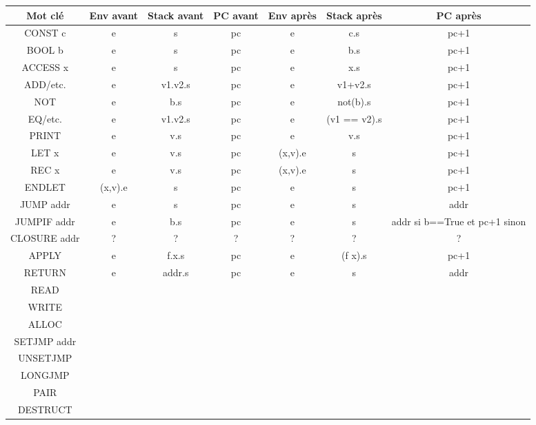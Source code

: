 \documentclass{article}
\begin{document}
\begin{footnotesize}
\begin{tabular}{ c | c | c  | c || c | c | c }

Mot clé & Env avant & Stack avant & PC avant & Env après & Stack après & PC après \\
\hline
CONST c & e & s & pc & e & c.s & pc+1 \\

BOOL b & e & s & pc & e & b.s & pc+1 \\

ACCESS x & e & s & pc & e & x.s & pc+1 \\

ADD/etc. & e & v1.v2.s & pc & e & v1+v2.s & pc+1\\

NOT & e & b.s & pc & e & not(b).s & pc+1\\

EQ/etc. & e & v1.v2.s & pc & e & (v1 == v2).s & pc+1\\

PRINT & e & v.s & pc & e & v.s & pc+1 \\

LET x & e & v.s & pc & (x,v).e & s & pc+1\\

REC x & e & v.s & pc & (x,v).e & s & pc+1\\

ENDLET & (x,v).e & s & pc & e & s & pc+1\\

JUMP addr & e & s & pc & e & s & addr\\

JUMPIF addr & e & b.s & pc & e & s & addr si b==True et pc+1 sinon\\

CLOSURE addr & ? & ? & ? & ? & ? & ?\\

APPLY & e & f.x.s & pc & e & (f x).s & pc+1\\

RETURN & e & addr.s & pc & e & s & addr\\

READ & &&&&&\\

WRITE & &&&&&\\

ALLOC & &&&&&\\

SETJMP addr &&& &&&\\

UNSETJMP & &&&&&\\

LONGJMP & &&&&&\\

PAIR & &&&&&\\

DESTRUCT & &&&&&\\

\end{tabular}
\end{footnotesize}
\end{document}
